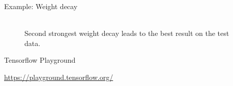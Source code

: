 \begin{vbframe}{Example: Weight decay}
\framebreak

\begin{figure}
\centering
{}
\\
Second strongest weight decay leads to the best result on the test data.
\end{figure}
\end{vbframe}
  
\begin{frame}{Tensorflow Playground}
\begin{figure}
\centering
{}
  \end{figure}
  \scriptsize
  \url{https://playground.tensorflow.org/}
\end{frame}

